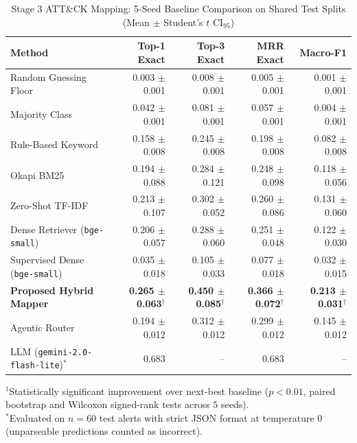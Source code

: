 \begin{table}[t]
\centering
\caption{Stage 3 ATT\&CK Mapping: 5-Seed Baseline Comparison on Shared Test Splits (Mean $\pm$ Student's $t$ CI$_{95}$)}
\label{tab:baselines}
\begin{tabular}{lrrrr}
\toprule
Method & Top-1 Exact & Top-3 Exact & MRR Exact & Macro-F1 \\ \midrule
Random Guessing Floor & 0.003 $\pm$ 0.001 & 0.008 $\pm$ 0.001 & 0.005 $\pm$ 0.001 & 0.001 $\pm$ 0.001 \\
Majority Class & 0.042 $\pm$ 0.001 & 0.081 $\pm$ 0.001 & 0.057 $\pm$ 0.001 & 0.004 $\pm$ 0.001 \\
Rule-Based Keyword & 0.158 $\pm$ 0.008 & 0.245 $\pm$ 0.008 & 0.198 $\pm$ 0.008 & 0.082 $\pm$ 0.008 \\
Okapi BM25 & 0.194 $\pm$ 0.088 & 0.284 $\pm$ 0.121 & 0.248 $\pm$ 0.098 & 0.118 $\pm$ 0.056 \\
Zero-Shot TF-IDF & 0.213 $\pm$ 0.107 & 0.302 $\pm$ 0.052 & 0.260 $\pm$ 0.086 & 0.131 $\pm$ 0.060 \\
Dense Retriever (\texttt{bge-small}) & 0.206 $\pm$ 0.057 & 0.288 $\pm$ 0.060 & 0.251 $\pm$ 0.048 & 0.122 $\pm$ 0.030 \\
Supervised Dense (\texttt{bge-small}) & 0.035 $\pm$ 0.018 & 0.105 $\pm$ 0.033 & 0.077 $\pm$ 0.018 & 0.032 $\pm$ 0.015 \\
\textbf{Proposed Hybrid Mapper} & \textbf{0.265 $\pm$ 0.063}$^{\dagger}$ & \textbf{0.450 $\pm$ 0.085}$^{\dagger}$ & \textbf{0.366 $\pm$ 0.072}$^{\dagger}$ & \textbf{0.213 $\pm$ 0.031}$^{\dagger}$ \\
Agentic Router & 0.194 $\pm$ 0.012 & 0.312 $\pm$ 0.012 & 0.299 $\pm$ 0.012 & 0.145 $\pm$ 0.012 \\
\midrule
LLM (\texttt{gemini-2.0-flash-lite})$^{*}$ & 0.683 & -- & 0.683 & -- \\
\bottomrule
\end{tabular}
\begin{flushleft}\footnotesize
$^{\dagger}$Statistically significant improvement over next-best baseline ($p < 0.01$, paired bootstrap and Wilcoxon signed-rank tests across $5$ seeds).\\
$^{*}$Evaluated on $n=60$ test alerts with strict JSON format at temperature 0 (unparseable predictions counted as incorrect).
\end{flushleft}
\end{table}
